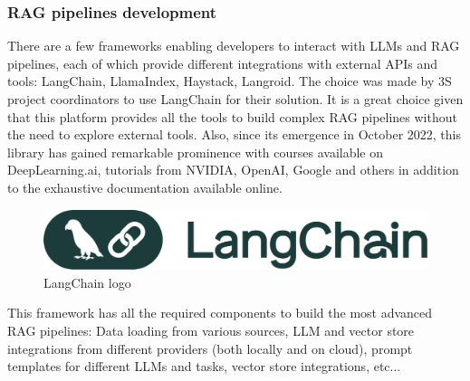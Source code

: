 \subsubsection*{RAG pipelines development}
There are a few frameworks enabling developers to interact with LLMs and RAG pipelines, each of which provide different integrations with external APIs and tools: LangChain, LlamaIndex, Haystack, Langroid.\newline
The choice was made by 3S project coordinators to use LangChain for their solution. It is a great choice given that this platform provides all the tools to build complex RAG pipelines without the need to explore external tools. Also, since its emergence in October 2022, this library has gained remarkable prominence with courses available on DeepLearning.ai, tutorials from NVIDIA, OpenAI, Google and others in addition to the exhaustive documentation available online.
\begin{figure}[htbp]
    \centering
    \includegraphics[width=.5\linewidth]{./figures/langchain-logo.png}
    \caption{LangChain logo}
\end{figure}\newline
This framework has all the required components to build the most advanced RAG pipelines: Data loading from various sources, LLM and vector store integrations from different providers (both locally and on cloud), prompt templates for different LLMs and tasks, vector store integrations, etc...
